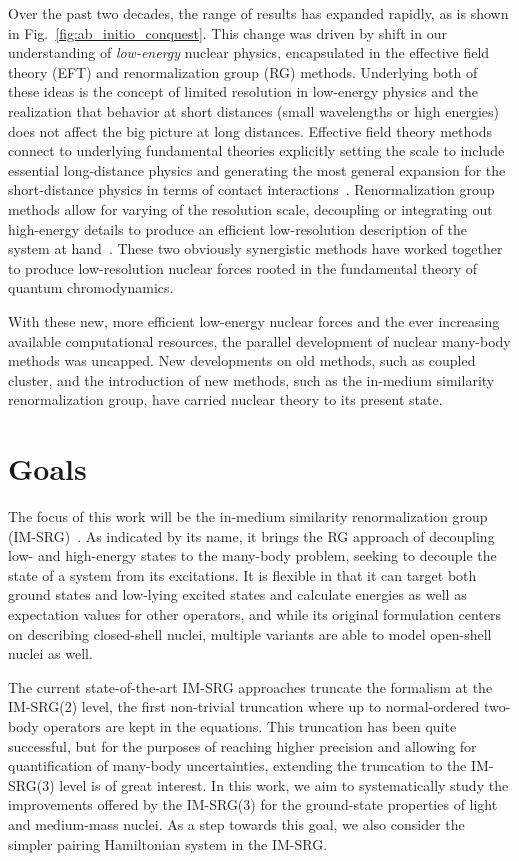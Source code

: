 Over the past two decades,
the range of \abinitio{} results has expanded rapidly,
as is shown in Fig.~\ref{fig:ab_initio_conquest}.
This change was driven by shift in our understanding of \textit{low-energy}
nuclear physics,
encapsulated in the effective field theory (EFT) and renormalization group (RG) methods.
Underlying both of these ideas is the concept of limited resolution in low-energy physics
and the realization that behavior at short distances (small wavelengths or high energies)
does not affect the big picture at long distances.
Effective field theory methods connect to underlying fundamental theories
explicitly setting the scale to include essential long-distance physics
and generating the most general expansion for the short-distance physics
in terms of contact interactions~\cite{Wein78eft,Hamm19nuceftreview}.
Renormalization group methods allow for varying of the resolution scale,
decoupling or integrating out high-energy details to produce an efficient low-resolution
description of the system at hand~\cite{Wils71rg,Bogn06srg,Bogn09vlowk}.
These two obviously synergistic methods have worked together to produce
low-resolution nuclear forces rooted in the fundamental theory of quantum chromodynamics.

With these new, more efficient low-energy nuclear forces
and the ever increasing available computational resources,
the parallel development of nuclear many-body methods was uncapped.
New developments on old methods, such as coupled cluster,
and the introduction of new methods,
such as the in-medium similarity renormalization group,
have carried \abinitio{} nuclear theory to its present state.

\section{Goals}

The focus of this work will be the in-medium similarity renormalization group (IM-SRG)~\cite{Tsuk10imsrg}.
As indicated by its name,
it brings the RG approach of decoupling low- and high-energy states to the many-body problem,
seeking to decouple the state of a system from its excitations.
It is flexible in that it can target both ground states and low-lying excited states
and calculate energies as well as expectation values for other operators,
and while its original formulation centers on describing closed-shell nuclei,
multiple variants are able to model open-shell nuclei as well.

The current state-of-the-art IM-SRG approaches truncate the formalism at the IM-SRG(2) level,
the first non-trivial truncation where up to normal-ordered two-body operators are kept in the equations.
This truncation has been quite successful,
but for the purposes of reaching higher precision and allowing for quantification
of many-body uncertainties,
extending the truncation to the IM-SRG(3) level is of great interest.
In this work, we aim to systematically study the improvements offered by the IM-SRG(3)
for the ground-state properties of light and medium-mass nuclei.
As a step towards this goal,
we also consider the simpler pairing Hamiltonian system in the IM-SRG.\@

